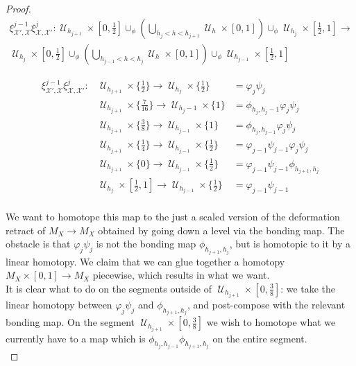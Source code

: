 \documentclass[a4paper,11pt]{article}
\theoremstyle{definition}
\theoremstyle{plain}
\theoremstyle{remark}
\DeclareMathOperator{\U}{\mathcal{U}}
\begin{document}
{\begin{proof}
\begin{align*}
\xi^{j-1}_{\mathcal{X}',\mathcal{X}} \xi^j_{\mathcal{X}, \mathcal{X}'}:  \U_{h_{j+1}} \times [0,\frac{1}{2}] \cup_{\phi} (\bigcup_{h_{j}<h<h_{j+1}} \U_{h} \times [0,1]) \cup_{\phi} \U_{h_j} \times [\frac{1}{2},1] \longrightarrow \\
 \U_{h_{j}} \times [0,\frac{1}{2}] \cup_{\phi} (\bigcup_{h_{j-1}<h<h_{j}} \U_{h} \times [0,1]) \cup_{\phi} \U_{h_{j-1}} \times [\frac{1}{2},1] 
\end{align*}


\begin{align*}
\xi^{j-1}_{\mathcal{X}',\mathcal{X}} \xi^j_{\mathcal{X}, \mathcal{X}'}:& \U_{h_{j+1}} \times \{\frac{1}{2}\} \rightarrow \U_{h_{j}} \times \{\frac{1}{2}\}\quad   &= \varphi_{j}\psi_{j}\\
&\U_{h_{j+1}} \times \{\frac{7}{16}\} \rightarrow \U_{h_{j}-1} \times \{1\}  &= \phi_{h_{j}, h_{j}-1} \varphi_{j} \psi_{j}\\
&\U_{h_{j+1}} \times \{\frac{3}{8}\} \rightarrow \U_{h_{j-1}} \times \{1\}   &=\phi_{h_{j}, h_{j-1}} \varphi_{j} \psi_{j}\\
&\U_{h_{j+1}} \times \{\frac{1}{4}\} \rightarrow \U_{h_{j-1}} \times \{\frac{1}{2}\}&= \varphi_{j-1}\psi_{j-1}\varphi_{j}\psi_{j}\\
&\U_{h_{j+1}} \times \{0\} \rightarrow \U_{h_{j-1}} \times \{\frac{1}{2}\} &= \varphi_{j-1}\psi_{j-1}\phi_{h_{j+1},h_{j}}\\
&\U_{h_{j}} \times [\frac{1}{2},1] \rightarrow \U_{h_{j-1}} \times \{\frac{1}{2}\} &= \varphi_{j-1} \psi_{j-1}\\
\end{align*}





We want to homotope this map to the just a scaled version of the deformation retract of $M_{X}\rightarrow M_{X}$ obtained by going down a level via the bonding map. The obstacle is that $\varphi_{j} \psi_{j}$ is not the bonding map $\phi_{h_{j+1}, h_{j}}$, but is homotopic to it by a linear homotopy. We claim that we can glue together a homotopy $M_{X}\times [0,1] \rightarrow M_{X}$ piecewise, which results in what we want. \\

It is clear what to do on the segments outside of $\U_{h_{j+1}} \times [0, \frac{3}{8}]$: we take the linear homotopy between $\varphi_{j} \psi_{j}$ and $\phi_{h_{j+1}, h_{j}}$, and post-compose with the relevant bonding map. On the segment $\U_{h_{j+1}} \times [0, \frac{3}{8}]$ we wish to homotope what we currently have to a map which is $\phi_{h_{j}, h_{j-1}} \phi_{h_{j+1}, h_{j}}$ on the entire segment. \\ 



\end{proof}}
\end{document}
